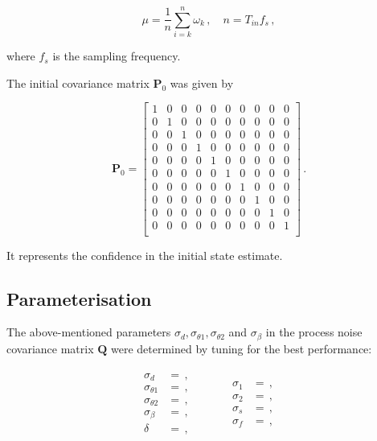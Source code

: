 \begin{equation}
  \mu = \frac{1}{n} \sum_{i=k}^{n}{\omega_k}\,, \quad n = T_{in} f_s\,,
\end{equation}

\noindent
where $f_s$ is the sampling frequency.

The initial covariance matrix $\mathbf{P}_{0}$ was given by

\begin{equation}
\mathbf{P}_0 = \begin{bmatrix}
  1 & 0 & 0 & 0 & 0 & 0 & 0 & 0 & 0 & 0\\
  0 & 1 & 0 & 0 & 0 & 0 & 0 & 0 & 0 & 0\\
  0 & 0 & 1 & 0 & 0 & 0 & 0 & 0 & 0 & 0\\
  0 & 0 & 0 & 1 & 0 & 0 & 0 & 0 & 0 & 0\\
  0 & 0 & 0 & 0 & 1 & 0 & 0 & 0 & 0 & 0\\
  0 & 0 & 0 & 0 & 0 & 1 & 0 & 0 & 0 & 0\\
  0 & 0 & 0 & 0 & 0 & 0 & 1 & 0 & 0 & 0\\
  0 & 0 & 0 & 0 & 0 & 0 & 0 & 1 & 0 & 0\\
  0 & 0 & 0 & 0 & 0 & 0 & 0 & 0 & 1 & 0\\
  0 & 0 & 0 & 0 & 0 & 0 & 0 & 0 & 0 & 1\\
\end{bmatrix}\,.
\end{equation}

\noindent
It represents the confidence in the initial state estimate.

\subsection{Parameterisation}

The above-mentioned parameters $\sigma_d, \sigma_{\theta 1}, \sigma_{\theta 2}$ and $\sigma_{\beta}$ in the process noise covariance matrix $\mathbf{Q}$ were determined by tuning for the best performance:

\begin{equation}
\begin{matrix}
	\begin{split}
	  \sigma_d &= \,, \\
	  \sigma_{\theta 1} &= \,, \\
	  \sigma_{\theta 2} &= \,, \\
	  \sigma_{\beta} &= \,, \\
	  \delta &= \,,
\end{split} \qquad \quad
    \begin{split}
	  \sigma_1 &= \,, \\
	  \sigma_2 &= \,, \\
	  \sigma_s &= \,, \\
	  \sigma_f &= \,,  
\end{split}
\end{matrix}
\end{equation}

